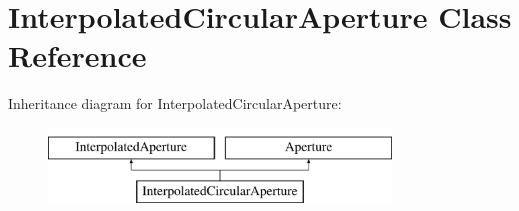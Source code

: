 \hypertarget{classInterpolatedCircularAperture}{}\section{Interpolated\+Circular\+Aperture Class Reference}
\label{classInterpolatedCircularAperture}
Inheritance diagram for Interpolated\+Circular\+Aperture\+:\begin{figure}[H]
\begin{center}
\leavevmode
\includegraphics[height=2.000000cm]{classInterpolatedCircularAperture}
\end{center}
\end{figure}
